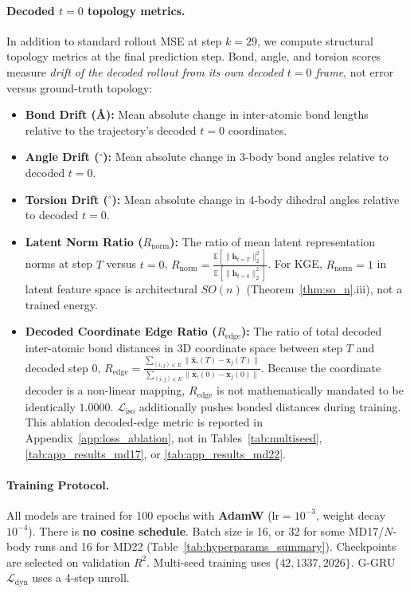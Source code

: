 \documentclass{article}
\newcommand{\GKE}{\textsc{KGE}}
\newcommand{\GGRU}{\textsc{G-GRU}}
\begin{document}
\paragraph{Decoded $t=0$ topology metrics.}
In addition to standard rollout MSE at step $k=29$, we compute structural topology metrics at the final prediction step. Bond, angle, and torsion scores measure \emph{drift of the decoded rollout from its own decoded $t=0$ frame}, not error versus ground-truth topology:
\begin{itemize}
  \item \textbf{Bond Drift (\AA):} Mean absolute change in inter-atomic bond lengths relative to the trajectory's decoded $t=0$ coordinates.
  \item \textbf{Angle Drift ($^\circ$):} Mean absolute change in 3-body bond angles relative to decoded $t=0$.
  \item \textbf{Torsion Drift ($^\circ$):} Mean absolute change in 4-body dihedral angles relative to decoded $t=0$.
  \item \textbf{Latent Norm Ratio ($R_{\text{norm}}$):} The ratio of mean latent representation norms at step $T$ versus $t=0$, $R_{\text{norm}} = \frac{\mathbb{E}[\| \mathbf{h}_{t=T} \|_2^2]}{\mathbb{E}[\| \mathbf{h}_{t=0} \|_2^2]}$. For \GKE{}, $R_{\text{norm}} = 1$ in latent feature space is architectural $SO(n)$ (Theorem~\ref{thm:so_n}.iii), not a trained energy.
  \item \textbf{Decoded Coordinate Edge Ratio ($R_{\text{edge}}$):} The ratio of total decoded inter-atomic bond distances in 3D coordinate space between step $T$ and decoded step $0$, $R_{\text{edge}} = \frac{\sum_{(i,j)\in E} \|\hat{\mathbf{x}}_i(T) - \hat{\mathbf{x}}_j(T)\|}{\sum_{(i,j)\in E} \|\hat{\mathbf{x}}_i(0) - \hat{\mathbf{x}}_j(0)\|}$. Because the coordinate decoder is a non-linear mapping, $R_{\text{edge}}$ is not mathematically mandated to be identically $1.0000$. $\mathcal{L}_{\text{iso}}$ additionally pushes bonded distances during training. This ablation decoded-edge metric is reported in Appendix~\ref{app:loss_ablation}, not in Tables~\ref{tab:multiseed}, \ref{tab:app_results_md17}, or \ref{tab:app_results_md22}.
\end{itemize}

\paragraph{Training Protocol.}
All models are trained for 100 epochs with \textbf{AdamW} ($\text{lr}=10^{-3}$, weight decay $10^{-4}$). There is \textbf{no cosine schedule}. Batch size is 16, or 32 for some MD17/$N$-body runs and 16 for MD22 (Table~\ref{tab:hyperparams_summary}). Checkpoints are selected on validation $R^2$. Multi-seed training uses $\{42, 1337, 2026\}$. \GGRU{} $\mathcal{L}_{\text{dyn}}$ uses a 4-step unroll.
\end{document}
